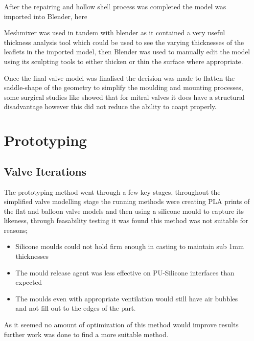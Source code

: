 After the repairing and hollow shell process was completed the model was imported into Blender, here

Meshmixer was used in tandem with blender as it contained a very useful thickness analysis tool which could be used to see the varying thicknesses of the leaflets in the imported model, then Blender was used to manually edit the model using its sculpting tools to either thicken or thin the surface where appropriate.





Once the final valve model was finalised the decision was made to flatten the saddle-shape of the geometry to simplify the moulding and mounting processes, some surgical studies like  showed that for mitral valves it does have a structural disadvantage however this did not reduce the ability to coapt properly.








\section{Prototyping}
\subsection{Valve Iterations}
The prototyping method went through a few key stages, throughout the simplified valve modelling stage the running methods were creating \gls{PLA} prints of the flat and balloon valve models and then using a silicone mould to capture its likeness, through feasability testing it was found this method was not suitable for reasons;
\begin{itemize}
    \item Silicone moulds could not hold firm enough in casting to maintain sub 1mm thicknesses
    \item The mould release agent was less effective on \gls{PU}-Silicone interfaces than expected
    \item The moulds even with appropriate ventilation would still have air bubbles and not fill out to the edges of the part.
\end{itemize}
As it seemed no amount of optimization of this method would improve results further work was done to find a more suitable method.

